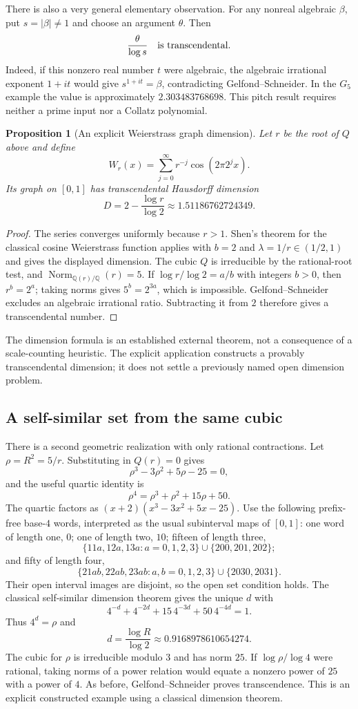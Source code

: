 \documentclass[11pt,a4paper]{article}
\newtheorem{proposition}[theorem]{Proposition}
\theoremstyle{definition}
\theoremstyle{remark}
\numberwithin{equation}{section}
\begin{document}
There is also a very general elementary observation. For any nonreal
algebraic $\beta$, put $s=|\beta|\ne1$ and choose an argument $\theta$.
Then
\[
 \frac{\theta}{\log s}\quad\hbox{is transcendental}.
\]
Indeed, if this nonzero real number $t$ were algebraic, the algebraic
irrational exponent $1+it$ would give
$s^{1+it}=\beta$, contradicting Gelfond--Schneider. In the $G_5$ example
the value is approximately $2.303483768698$. This pitch result requires
neither a prime input nor a Collatz polynomial.

\begin{proposition}[An explicit Weierstrass graph dimension]
Let $r$ be the root of $Q$ above and define
\[
 W_r(x)=\sum_{j=0}^{\infty}r^{-j}\cos(2\pi2^j x).
\]
Its graph on $[0,1]$ has transcendental Hausdorff dimension
\[
 D=2-\frac{\log r}{\log2}
   \approx1.51186762724349.
\]
\end{proposition}
\begin{proof}
The series converges uniformly because $r>1$. Shen's theorem for the
classical cosine Weierstrass function \cite{R094} applies with $b=2$
and $\lambda=1/r\in(1/2,1)$ and gives the displayed dimension.
The cubic $Q$ is irreducible by the rational-root test, and
$\operatorname{Norm}_{\mathbb Q(r)/\mathbb Q}(r)=5$.
If $\log r/\log2=a/b$ with integers $b>0$, then $r^b=2^a$;
taking norms gives $5^b=2^{3a}$, which is impossible. Gelfond--Schneider
excludes an algebraic irrational ratio. Subtracting it from $2$
therefore gives a transcendental number.
\end{proof}
The dimension formula is an established external theorem, not a
consequence of a scale-counting heuristic. The explicit application
constructs a provably transcendental dimension; it does not settle a
previously named open dimension problem.

\subsection{A self-similar set from the same cubic}
There is a second geometric realization with only rational contractions.
Let $\rho=R^2=5/r$. Substituting in $Q(r)=0$ gives
\[
 \rho^3-3\rho^2+5\rho-25=0,
\]
and the useful quartic identity is
\[
 \rho^4=\rho^3+\rho^2+15\rho+50.
\]
The quartic factors as $(x+2)(x^3-3x^2+5x-25)$.
Use the following prefix-free base-$4$ words, interpreted as the usual
subinterval maps of $[0,1]$: one word of length one, $0$; one of length
two, $10$; fifteen of length three,
\[
 \{11a,12a,13a:a=0,1,2,3\}\cup\{200,201,202\};
\]
and fifty of length four,
\[
 \{21ab,22ab,23ab:a,b=0,1,2,3\}\cup\{2030,2031\}.
\]
Their open interval images are disjoint, so the open set condition
holds. The classical self-similar dimension theorem \cite{R095}
gives the unique $d$ with
\[
 4^{-d}+4^{-2d}+15\,4^{-3d}+50\,4^{-4d}=1.
\]
Thus $4^d=\rho$ and
\[
 d=\frac{\log R}{\log2}\approx0.9168978610654274.
\]
The cubic for $\rho$ is irreducible modulo $3$ and has norm $25$.
If $\log\rho/\log4$ were rational, taking norms of a power relation
would equate a nonzero power of $25$ with a power of $4$. As before,
Gelfond--Schneider proves transcendence. This is an explicit constructed
example using a classical dimension theorem.
\end{document}
